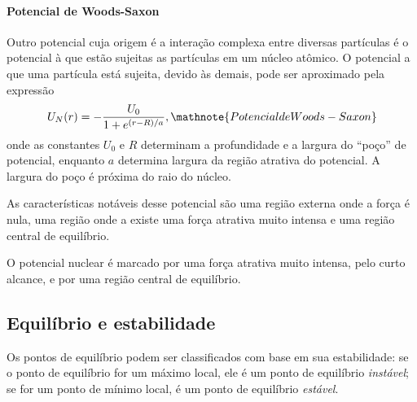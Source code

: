 \paragraph{Potencial de Woods-Saxon}

Outro potencial cuja origem é a interação complexa entre diversas partículas é o potencial à que estão sujeitas as partículas em um núcleo atômico. O potencial a que uma partícula está sujeita, devido às demais, pode ser aproximado pela expressão
\begin{equation}
    U_N(r) = - \frac{U_0}{1 + e^{(r - R) / a}}, \mathnote{Potencial de Woods-Saxon}
\end{equation}
%
onde as constantes $U_0$ e $R$ determinam a profundidade e a largura do ``poço'' de potencial, enquanto $a$ determina largura da região atrativa do potencial. A largura do poço é próxima do raio do núcleo.

As características notáveis desse potencial são uma região externa onde a força é nula, uma região onde a existe uma força atrativa muito intensa e uma região central de equilíbrio.

\begin{marginfigure}
\centering
{}
\caption{O potencial nuclear é marcado por uma força atrativa muito intensa, pelo curto alcance, e por uma região central de equilíbrio.}
\end{marginfigure}

\subsection{Equilíbrio e estabilidade}

Os pontos de equilíbrio podem ser classificados com base em sua estabilidade: se o ponto de equilíbrio for um máximo local, ele é um ponto de equilíbrio \emph{instável}; se for um ponto de mínimo local, é um ponto de equilíbrio \emph{estável}.

